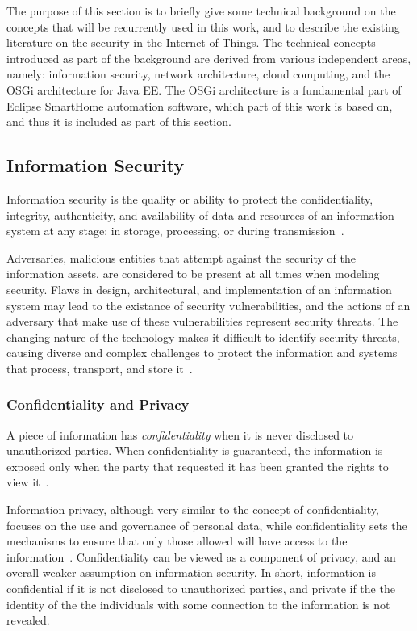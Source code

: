 \documentclass[12pt]{article}
\begin{document}
The purpose of this section is to briefly give some technical background on the concepts that will be recurrently used in this work, and to describe the existing literature on the security in the Internet of Things. The technical concepts introduced as part of the background are derived from various independent areas, namely: information security, network architecture, cloud computing, and the OSGi architecture for Java EE. The OSGi architecture is a fundamental part of Eclipse SmartHome automation software, which part of this work is based on, and thus it is included as part of this section.

\subsection{Information Security}

Information security is the quality or ability to protect the confidentiality, integrity, authenticity, and availability of data and resources of an information system at any stage: in storage, processing, or during transmission~\cite{whitman2011principles}.

Adversaries, malicious entities that attempt against the security of the information assets, are considered to be present at all times when modeling security. Flaws in design, architectural, and implementation of an information system may lead to the existance of security vulnerabilities, and the actions of an adversary that make use of these vulnerabilities represent security threats. The changing nature of the technology makes it difficult to identify security threats, causing diverse and complex challenges to protect the information and systems that process, transport, and store it~\cite{whitman2003}.

\subsubsection{Confidentiality and Privacy}

A piece of information has \emph{confidentiality} when it is never disclosed to unauthorized parties. When confidentiality is guaranteed, the information is exposed only when the party that requested it has been granted the rights to view it~\cite{whitman2011principles}.

Information privacy, although very similar to the concept of confidentiality, focuses on the use and governance of personal data, while confidentiality sets the mechanisms to ensure that only those allowed will have access to the information~\cite{heckman}. Confidentiality can be viewed as a component of privacy, and an overall weaker assumption on information security. In short, information is confidential if it is not disclosed to unauthorized parties, and private if the the identity of the the individuals with some connection to the information is not revealed.
\end{document}
